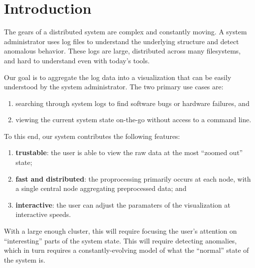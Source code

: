 \documentclass[conference]{style/acmsiggraph}
\begin{document}
\begin{CRcatlist}
\end{CRcatlist}

\keywordlist


\TOGlinkslist


\copyrightspace

\section{Introduction}

The gears of a distributed system are complex and constantly moving.
A system administrator uses log files to understand the underlying structure and detect anomalous behavior.
These logs are large, distributed across many filesystems, and hard to understand even with today's tools.

Our goal is to aggregate the log data into a visualization that can be easily understood by the system administrator.
The two primary use cases are:
\begin{enumerate}
\item searching through system logs to find software bugs or hardware failures, and
\item viewing the current system state on-the-go without access to a command line.
\end{enumerate}
To this end, our system contributes the following features:
\begin{enumerate}
\item \textbf{trustable}: the user is able to view the raw data at the most ``zoomed out'' state;
\item \textbf{fast and distributed}: the proprocessing primarily occurs at each node, with a single central node aggregating preprocessed data; and
\item \textbf{interactive}: the user can adjust the paramaters of the visualization at interactive speeds.
\end{enumerate}

With a large enough cluster, this will require focusing the user’s attention on “interesting” parts
of the system state. This will require detecting anomalies, which in turn requires a
constantly-evolving model of what the “normal” state of the system is.
\end{document}
